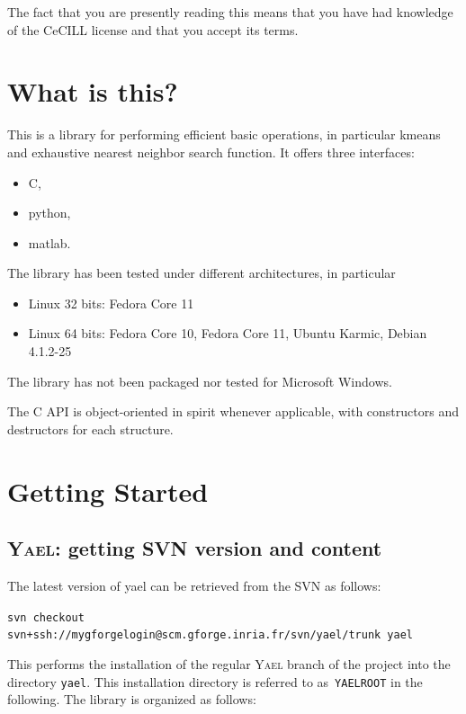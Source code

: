\documentclass[a4paper,11pt,notitlepage,final,twoside]{report}
\newcommand{\yael}{\textsc{Yael}\xspace}
\newcommand{\yroot}{\texttt{YAELROOT}\xspace}
\begin{document}
The fact that you are presently reading this means that you have had
knowledge of the CeCILL license and that you accept its terms.


\tableofcontents            %


\chapter{What is this?}

This is a library for performing efficient basic operations, 
in particular kmeans and exhaustive nearest neighbor search function.
It offers three interfaces: 
\begin{itemize}
\item C, 
\item python, 
\item matlab.
\end{itemize}

The library has been tested under different architectures, in particular
\begin{itemize}
\item Linux 32 bits: Fedora Core 11
\item Linux 64 bits: Fedora Core 10, Fedora Core 11, Ubuntu Karmic, Debian 4.1.2-25
\end{itemize}
The library has not been packaged nor tested for Microsoft Windows. 

The C API is object-oriented in spirit whenever applicable, with constructors and destructors for each structure. 

\chapter{Getting Started}

\section{\yael: getting SVN version and content}

The latest version of yael can be retrieved from the SVN as follows:

\texttt{svn checkout svn+ssh://mygforgelogin@scm.gforge.inria.fr/svn/yael/trunk yael}
\medskip

This performs the installation of the regular \yael branch of the project into the directory \texttt{yael}. 
This installation directory is referred to as~\yroot in the following. 
The library is organized as follows: 
\medskip
\end{document}
